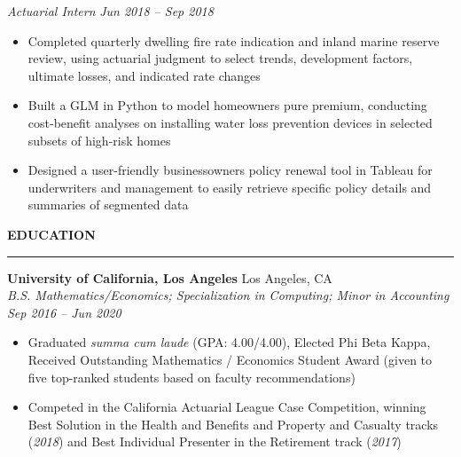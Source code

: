 \documentclass[11pt,letterpaper]{article}
\newcommand{\sectline}{\vspace{5pt}\hrule height 1.5pt\vspace{5pt}}
\newcommand{\sectspace}{\vspace{10pt}}
\newcommand{\smallspace}{\vspace{5pt}}
\begin{document}
\textit{Actuarial Intern} \hfill \textit{Jun 2018 -- Sep 2018}
\begin{itemize}
	\item Completed quarterly dwelling fire rate indication and inland marine reserve review, using actuarial judgment to select trends, development factors, ultimate losses, and indicated rate changes
	\item Built a GLM in Python to model homeowners pure premium, conducting cost-benefit analyses on installing water loss prevention devices in selected subsets of high-risk homes 
	\item Designed a user-friendly businessowners policy renewal tool in Tableau for underwriters and management to easily retrieve specific policy details and summaries of segmented data	
\end{itemize}
\sectspace

\textbf{EDUCATION}\sectline
\textbf{University of California, Los Angeles} \hfill Los Angeles, CA \\
\textit{B.S. Mathematics/Economics; Specialization in Computing; Minor in Accounting} \hfill \textit{Sep 2016 -- Jun 2020}
\begin{itemize}
	\item Graduated \textit{summa cum laude} (GPA: 4.00/4.00), Elected Phi Beta Kappa, Received Outstanding Mathematics / Economics Student Award (given to five  top-ranked students based on faculty recommendations)
	\item Competed in the California Actuarial League Case Competition, winning Best Solution in the Health and Benefits and Property and Casualty tracks (\textit{2018}) and Best Individual Presenter in the Retirement track (\textit{2017})
\end{itemize}
\sectspace
\end{document}
